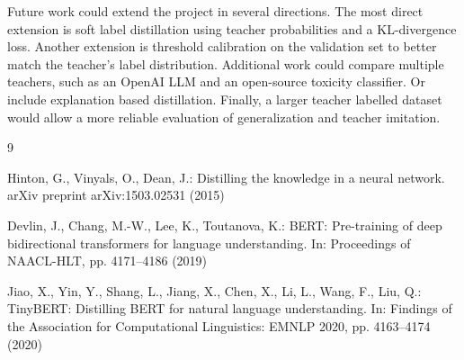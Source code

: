 \documentclass[pdflatex,sn-mathphys-num]{sn-jnl}
\begin{document}
Future work could extend the project in several directions.
The most direct extension is soft label distillation using teacher probabilities and a KL-divergence loss.
Another extension is threshold calibration on the validation set to better match the teacher's label distribution.
Additional work could compare multiple teachers, such as an OpenAI LLM and an open-source toxicity classifier.
Or include explanation based distillation.
Finally, a larger teacher labelled dataset would allow a more reliable evaluation of generalization and teacher imitation.

\begin{thebibliography}{9}

Hinton, G., Vinyals, O., Dean, J.: Distilling the knowledge in a neural network. arXiv preprint arXiv:1503.02531 (2015)

Devlin, J., Chang, M.-W., Lee, K., Toutanova, K.: BERT: Pre-training of deep bidirectional transformers for language understanding. In: Proceedings of NAACL-HLT, pp. 4171--4186 (2019)

Jiao, X., Yin, Y., Shang, L., Jiang, X., Chen, X., Li, L., Wang, F., Liu, Q.: TinyBERT: Distilling BERT for natural language understanding. In: Findings of the Association for Computational Linguistics: EMNLP 2020, pp. 4163--4174 (2020)

\end{thebibliography}
\end{document}
